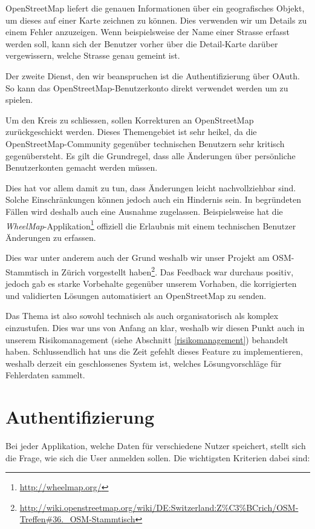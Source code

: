 \gls{OpenStreetMap} liefert die genauen Informationen über ein geografisches Objekt, um dieses auf einer Karte zeichnen zu können.
Dies verwenden wir um Details zu einem Fehler anzuzeigen.
Wenn beispielsweise der Name einer Strasse erfasst werden soll, kann sich der Benutzer vorher über die Detail-Karte darüber vergewissern, welche Strasse genau gemeint ist.

Der zweite Dienst, den wir beanspruchen ist die Authentifizierung über \gls{OAuth}.
So kann das \gls{OpenStreetMap}-Benutzerkonto direkt verwendet werden um \kort zu spielen.

Um den Kreis zu schliessen, sollen Korrekturen an \gls{OpenStreetMap} zurückgeschickt werden.
Dieses Themengebiet ist sehr heikel, da die \gls{OpenStreetMap}-Community gegenüber technischen Benutzern sehr kritisch gegenübersteht.
Es gilt die Grundregel, dass alle Änderungen über persönliche Benutzerkonten gemacht werden müssen.

Dies hat vor allem damit zu tun, dass Änderungen leicht nachvollziehbar sind.
Solche Einschränkungen können jedoch auch ein Hindernis sein.
In begründeten Fällen wird deshalb auch eine Ausnahme zugelassen.
Beispielsweise hat die \emph{WheelMap}-Applikation\footnote{\url{http://wheelmap.org/}} offiziell die Erlaubnis mit einem technischen Benutzer Änderungen zu erfassen.

Dies war unter anderem auch der Grund weshalb wir unser Projekt am OSM-Stammtisch in Zürich vorgestellt haben\footnote{\url{http://wiki.openstreetmap.org/wiki/DE:Switzerland:Z\%C3\%BCrich/OSM-Treffen\#36._OSM-Stammtisch}}.
Das Feedback war durchaus positiv, jedoch gab es starke Vorbehalte gegenüber unserem Vorhaben, die korrigierten und validierten Lösungen automatisiert an \gls{OpenStreetMap} zu senden.

Das Thema ist also sowohl technisch als auch organisatorisch als komplex einzustufen.
Dies war uns von Anfang an klar, weshalb wir diesen Punkt auch in unserem Risikomanagement (siehe Abschnitt \ref{risikomanagement}) behandelt haben.
Schlussendlich hat uns die Zeit gefehlt dieses Feature zu implementieren, weshalb \kort derzeit ein geschlossenes System ist, welches Lösungvorschläge für Fehlerdaten sammelt.

\section{Authentifizierung}
Bei jeder Applikation, welche Daten für verschiedene Nutzer speichert, stellt sich die Frage, wie sich die User anmelden sollen.
Die wichtigsten Kriterien dabei sind:

